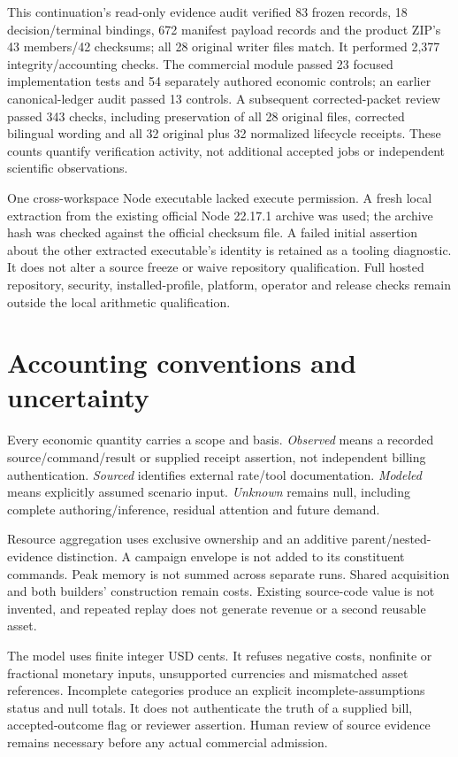 \documentclass[11pt,letterpaper]{article}
\begin{document}
This continuation's read-only evidence audit verified 83 frozen records, 18 decision/terminal bindings, 672 manifest payload records and the product ZIP's 43 members/42 checksums; all 28 original writer files match. It performed 2,377 integrity/accounting checks. The commercial module passed 23 focused implementation tests and 54 separately authored economic controls; an earlier canonical-ledger audit passed 13 controls. A subsequent corrected-packet review passed 343 checks, including preservation of all 28 original files, corrected bilingual wording and all 32 original plus 32 normalized lifecycle receipts. These counts quantify verification activity, not additional accepted jobs or independent scientific observations.

One cross-workspace Node executable lacked execute permission. A fresh local extraction from the existing official Node 22.17.1 archive was used; the archive hash was checked against the official checksum file. A failed initial assertion about the other extracted executable's identity is retained as a tooling diagnostic. It does not alter a source freeze or waive repository qualification. Full hosted repository, security, installed-profile, platform, operator and release checks remain outside the local arithmetic qualification.

\section{Accounting conventions and uncertainty}
Every economic quantity carries a scope and basis. \emph{Observed} means a recorded source/command/result or supplied receipt assertion, not independent billing authentication. \emph{Sourced} identifies external rate/tool documentation. \emph{Modeled} means explicitly assumed scenario input. \emph{Unknown} remains null, including complete authoring/inference, residual attention and future demand.

Resource aggregation uses exclusive ownership and an additive parent/nested-evidence distinction. A campaign envelope is not added to its constituent commands. Peak memory is not summed across separate runs. Shared acquisition and both builders' construction remain costs. Existing source-code value is not invented, and repeated replay does not generate revenue or a second reusable asset.

The model uses finite integer USD cents. It refuses negative costs, nonfinite or fractional monetary inputs, unsupported currencies and mismatched asset references. Incomplete categories produce an explicit incomplete-assumptions status and null totals. It does not authenticate the truth of a supplied bill, accepted-outcome flag or reviewer assertion. Human review of source evidence remains necessary before any actual commercial admission.
\end{document}
